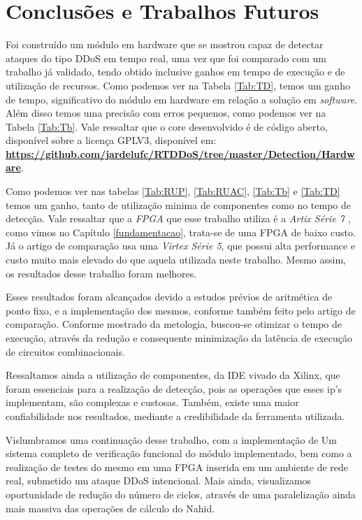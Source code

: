 \chapter[Conclusões e Trabalhos Futuros]{Conclusões e Trabalhos Futuros}
Foi construído um módulo em hardware que se mostrou capaz de detectar ataques do tipo DDoS em tempo real, uma vez que foi comparado com um trabalho já validado, tendo obtido inclusive ganhos em tempo de execução e de utilização de recursos. Como podemos ver na Tabela \ref{Tab:TD}, temos um ganho de tempo, significativo do módulo em hardware em relação a solução em \textit{software}. Além disso temos uma precisão com erros pequenos, como podemos ver na Tabela \ref{Tab:Tb}. Vale ressaltar que o core desenvolvido é de código aberto, disponível sobre a licença GPLV3, disponível em: \textbf{\url{https://github.com/jardelufc/RTDDoS/tree/master/Detection/Hardware}}.

Como podemos ver nas tabelas \ref{Tab:RUP}, \ref{Tab:RUAC}, \ref{Tab:Tb} e \ref{Tab:TD} temos um ganho, tanto de utilização minima de componentes como no tempo de detecção. Vale ressaltar que a \textit{FPGA} que esse trabalho utiliza é a \textit{Artix Série 7} , como vimos no Capítulo \ref{fundamentacao}, trata-se de uma FPGA de baixo custo. Já o artigo de comparação usa uma \textit{Virtex Série 5}, que possui alta performance e custo muito mais elevado do que aquela utilizada neste trabalho. Mesmo assim, os resultados desse trabalho foram melhores.

Esses resultados foram alcançados devido a estudos prévios de aritmética de ponto fixo,  e a implementação dos mesmos, conforme também feito pelo artigo de comparação. Conforme mostrado da metologia, buscou-se otimizar o tempo de execução, através da redução e consequente  minimização da latência de execução de circuitos combinacionais.

Ressaltamos ainda a utilização de componentes, da IDE vivado da Xilinx, que foram essenciais para a realização de detecção, pois as operações que esses ip's implementam, são complexas e custosas. Também, existe uma maior confiabilidade nos resultados, mediante a credibilidade da ferramenta utilizada.

Vislumbramos uma continuação desse trabalho, com a implementação de Um sistema completo de verificação funcional do módulo implementado, bem como a realização de testes do mesmo em uma FPGA inserida em um ambiente de rede real, submetido um ataque DDoS intencional. Mais ainda, visualizamos oportunidade de redução do número de ciclos, através de uma paralelização ainda mais massiva das operações de cálculo do Nahid. 


